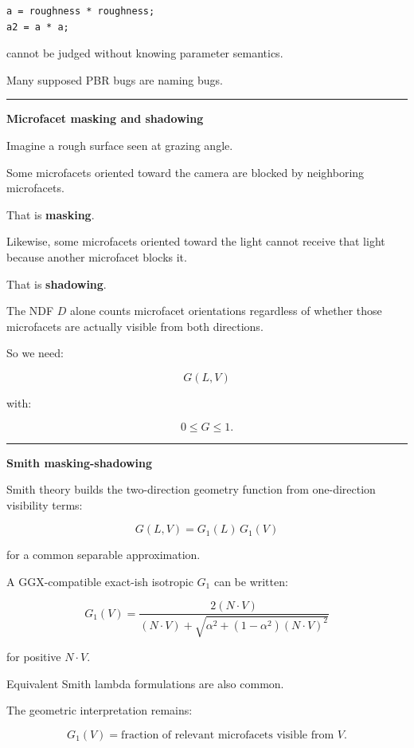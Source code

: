 \begin{verbatim}
a = roughness * roughness;
a2 = a * a;
\end{verbatim}

cannot be judged without knowing parameter semantics.

Many supposed PBR bugs are naming bugs.

\begin{center}\rule{0.5\linewidth}{0.5pt}\end{center}

\textbf{Microfacet masking and shadowing}

Imagine a rough surface seen at grazing angle.

Some microfacets oriented toward the camera are blocked by neighboring microfacets.

That is \textbf{masking}.

Likewise, some microfacets oriented toward the light cannot receive that light because another microfacet blocks it.

That is \textbf{shadowing}.

The NDF \(D\) alone counts microfacet orientations regardless of whether those microfacets are actually visible from both directions.

So we need:

\[
\boxed{
G(L,V)
}
\]

with:

\[
0\le G\le1.
\]

\begin{center}\rule{0.5\linewidth}{0.5pt}\end{center}

\textbf{Smith masking-shadowing}

Smith theory builds the two-direction geometry function from one-direction visibility terms:

\[
\boxed{
G(L,V)
=
G_1(L)\,G_1(V)
}
\]

for a common separable approximation.

A GGX-compatible exact-ish isotropic \(G_1\) can be written:

\[
\boxed{
G_1(V)
=
\frac{
2(N\cdot V)
}{
(N\cdot V)
+
\sqrt{
\alpha^2+
(1-\alpha^2)(N\cdot V)^2
}
}
}
\]

for positive \(N\cdot V\).

Equivalent Smith lambda formulations are also common.

The geometric interpretation remains:

\[
G_1(V)
=
\text{fraction of relevant microfacets visible from }V.
\]

